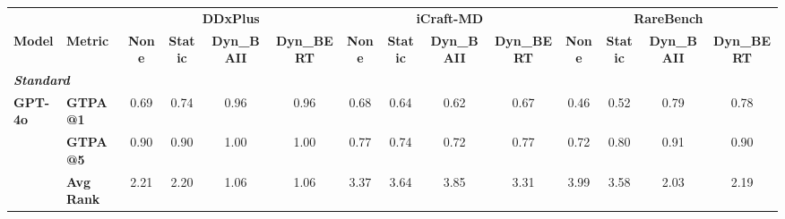 \setlength{\tabcolsep}{2.5pt}
\begin{table*}[h]
    \centering
    \scriptsize
    \begin{tabular}{l l cccc cccc cccc}
    \toprule
    & & \multicolumn{4}{c}{\textbf{DDxPlus}} & \multicolumn{4}{c}{\textbf{iCraft-MD}} & \multicolumn{4}{c}{\textbf{RareBench}} \\
    \cmidrule(lr){3-6} \cmidrule(lr){7-10} \cmidrule(lr){11-14}
    \textbf{Model} & \textbf{Metric} & \textbf{None} & \textbf{Static} & \textbf{Dyn\_BAII} & \textbf{Dyn\_BERT} 
                              & \textbf{None} & \textbf{Static} & \textbf{Dyn\_BAII} & \textbf{Dyn\_BERT} 
                              & \textbf{None} & \textbf{Static} & \textbf{Dyn\_BAII} & \textbf{Dyn\_BERT} \\
                              
    \midrule
    \multicolumn{14}{l}{\textit{\textbf{Standard}}}\\
    \midrule
    \multirow{3}{*}{\textbf{GPT-4o}} 
    & \textbf{GTPA@1} & 0.69 & 0.74 & 0.96 & 0.96 & 0.68 & 0.64 & 0.62 & 0.67 & 0.46 & 0.52 & 0.79 & 0.78 \\
    & \textbf{GTPA@5} & 0.90 & 0.90 & 1.00 & 1.00 & 0.77 & 0.74 & 0.72 & 0.77 & 0.72 & 0.80 & 0.91 & 0.90 \\
    & \textbf{Avg Rank} & 2.21 & 2.20 & 1.06 & 1.06 & 3.37 & 3.64 & 3.85 & 3.31 & 3.99 & 3.58 & 2.03 & 2.19 \\
    \midrule


\end{tabular}
\end{table*}
